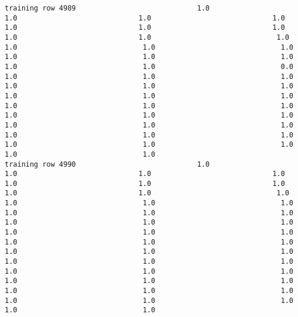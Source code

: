 \documentclass[11pt]{article}
\begin{document}
\begin{verbatim}
training row 4989                             1.0                             1.0                             1.0                             1.0                             1.0                             1.0                             1.0                             1.0                             1.0                              1.0                              1.0                              1.0                              1.0                              1.0                              1.0                              1.0                              1.0                              1.0                              0.0                              1.0                              1.0                              1.0                              1.0                              1.0                              1.0                              1.0                              1.0                              1.0                              1.0                              1.0                              1.0                              1.0                              1.0                              1.0                              1.0                              1.0                              1.0                              1.0                              1.0                              1.0                              1.0                              1.0                              1.0                              1.0                              1.0
training row 4990                             1.0                             1.0                             1.0                             1.0                             1.0                             1.0                             1.0                             1.0                             1.0                              1.0                              1.0                              1.0                              1.0                              1.0                              1.0                              1.0                              1.0                              1.0                              1.0                              1.0                              1.0                              1.0                              1.0                              1.0                              1.0                              1.0                              1.0                              1.0                              1.0                              1.0                              1.0                              1.0                              1.0                              1.0                              1.0                              1.0                              1.0                              1.0                              1.0                              1.0                              1.0                              1.0                              1.0                              1.0                              1.0

\end{verbatim}
\end{document}
